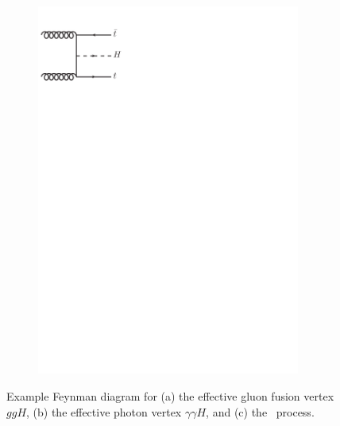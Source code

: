 \begin{figure}[htb!]
\begin{subfigure}{0.32\textwidth}
  \includegraphics[trim=0cm 22.5cm 12cm 0cm, clip=true, width=0.95\textwidth]{Analysis/Figures_ttH/ttH.pdf}
  \caption{}\label{fig:eff_vtx_ttH}\end{subfigure}
\caption{Example Feynman diagram for (a) the effective gluon fusion vertex $ggH$, (b) the effective photon vertex $\gamma\gamma H$, and (c) the \ttH\ process.}
  \label{fig:eff_vtx}
\end{figure}
